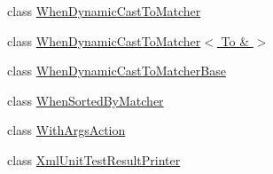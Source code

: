 \begin{DoxyCompactItemize}
\item 
class \hyperlink{classtesting_1_1internal_1_1WhenDynamicCastToMatcher}{When\+Dynamic\+Cast\+To\+Matcher}
\item 
class \hyperlink{classtesting_1_1internal_1_1WhenDynamicCastToMatcher_3_01To_01_6_01_4}{When\+Dynamic\+Cast\+To\+Matcher$<$ To \& $>$}
\item 
class \hyperlink{classtesting_1_1internal_1_1WhenDynamicCastToMatcherBase}{When\+Dynamic\+Cast\+To\+Matcher\+Base}
\item 
class \hyperlink{classtesting_1_1internal_1_1WhenSortedByMatcher}{When\+Sorted\+By\+Matcher}
\item 
class \hyperlink{classtesting_1_1internal_1_1WithArgsAction}{With\+Args\+Action}
\item 
class \hyperlink{classtesting_1_1internal_1_1XmlUnitTestResultPrinter}{Xml\+Unit\+Test\+Result\+Printer}
\end{DoxyCompactItemize}

